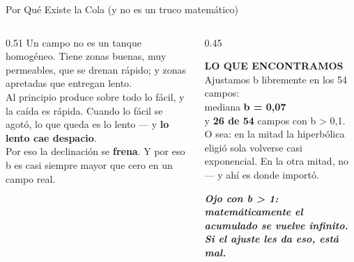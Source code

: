 \documentclass[aspectratio=169, 11pt]{beamer}
\begin{document}
\begin{frame}[shrink=8]{Por Qué Existe la Cola (y no es un truco matemático)}
  \vspace{-4pt}
  \begin{columns}[T]
    \begin{column}{0.51\textwidth}
      {\footnotesize\color{textMuted}
      Un campo no es un tanque homogéneo. Tiene zonas buenas, muy permeables,
      que se drenan rápido; y zonas apretadas que entregan lento.\\[6pt]
      Al principio produce sobre todo lo fácil, y la caída es rápida.
      Cuando lo fácil se agotó, lo que queda es lo lento --- y \textbf{lo
      lento cae despacio}.\\[6pt]
      Por eso la declinación se \textbf{frena}. Y por eso b es casi siempre
      mayor que cero en un campo real.}
    \end{column}
    \begin{column}{0.45\textwidth}
      \begin{tcolorbox}[colback=arcaGray, colframe=arcaDark, boxrule=0pt, leftrule=3pt,
        arc=3pt, left=6pt, right=6pt, top=5pt, bottom=5pt]
        {\scriptsize\color{arcaDark}\bfseries\faChartLine\hspace{4pt}LO QUE ENCONTRAMOS}\\[4pt]
        {\scriptsize\color{textMuted}
         Ajustamos b libremente en los 54 campos:\\[4pt]
         mediana \textbf{b = 0{,}07}\\
         y \textbf{26 de 54} campos con b > 0{,}1.\\[5pt]
         O sea: en la mitad la hiperbólica eligió sola volverse casi
         exponencial. En la otra mitad, no --- y ahí es donde importó.}
      \end{tcolorbox}
      \vspace{5pt}
      {\scriptsize\color{arcaRed}\bfseries\itshape
        Ojo con b > 1: matemáticamente el acumulado se vuelve infinito.
        Si el ajuste les da eso, está mal.}
    \end{column}
  \end{columns}
\end{frame}
\end{document}

